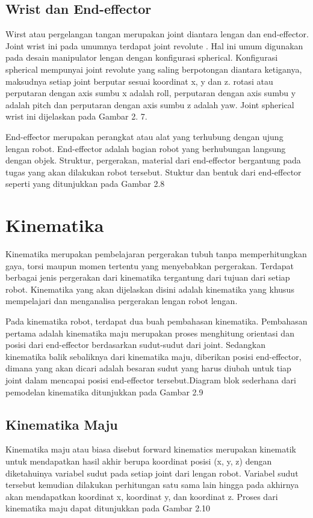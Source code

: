 \subsection{ Wrist dan End-effector }

Wirst atau pergelangan tangan merupakan joint diantara lengan dan end-effector. Joint wrist ini pada umumnya terdapat joint revolute . Hal ini umum digunakan pada desain manipulator lengan dengan konfigurasi spherical. Konfigurasi spherical mempunyai joint revolute yang saling berpotongan diantara ketiganya, maksudnya setiap joint berputar sesuai koordinat x, y dan z. rotasi atau perputaran dengan axis sumbu x adalah roll, perputaran dengan axis sumbu y adalah pitch dan perputaran dengan axis sumbu z adalah yaw. Joint spherical wrist ini dijelaskan pada Gambar 2. 7.


End-effector merupakan perangkat atau alat yang terhubung dengan ujung lengan robot. End-effector adalah bagian robot yang berhubungan langsung dengan objek. Struktur, pergerakan, material dari end-effector bergantung pada tugas yang akan dilakukan robot tersebut. Stuktur dan bentuk dari end-effector seperti yang ditunjukkan pada Gambar 2.8

\section{Kinematika}
Kinematika merupakan pembelajaran pergerakan tubuh tanpa memperhitungkan gaya, torsi maupun momen tertentu yang menyebabkan pergerakan. Terdapat berbagai jenis pergerakan dari kinematika tergantung dari tujuan dari setiap robot. Kinematika yang akan dijelaskan disini adalah kinematika yang khusus mempelajari dan menganalisa pergerakan lengan robot lengan.  

Pada kinematika robot, terdapat dua buah pembahasan kinematika. Pembahasan pertama adalah kinematika maju merupakan proses menghitung orientasi dan posisi dari end-effector berdasarkan sudut-sudut dari joint.  Sedangkan kinematika balik sebaliknya dari kinematika maju, diberikan posisi end-effector, dimana yang akan dicari adalah besaran sudut yang harus diubah untuk tiap joint dalam mencapai posisi end-effector tersebut.Diagram blok sederhana dari pemodelan kinematika ditunjukkan pada Gambar 2.9

\subsection{Kinematika Maju}
Kinematika maju atau biasa disebut forward kinematics merupakan kinematik untuk mendapatkan hasil akhir berupa koordinat posisi (x, y, z) dengan diketahuinya variabel sudut pada setiap joint dari lengan robot.  Variabel sudut tersebut kemudian dilakukan perhitungan satu sama lain hingga pada akhirnya akan mendapatkan koordinat x, koordinat y, dan koordinat z. Proses dari kinematika maju dapat ditunjukkan pada Gambar 2.10


